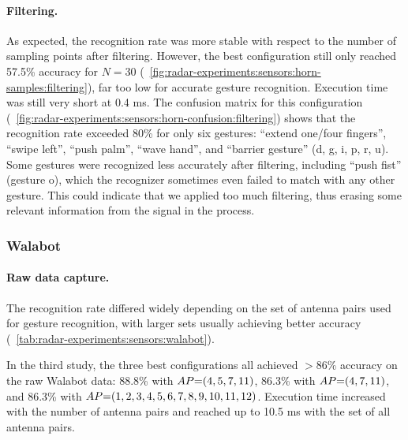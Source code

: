 \paragraph{Filtering.}
As expected, the recognition rate was more stable with respect to the number of sampling points after filtering. However, the best configuration still only reached 57.5\% accuracy for $N{=}30$ (\fig~\ref{fig:radar-experiments:sensors:horn-samples:filtering}), far too low for accurate gesture recognition. 
Execution time was still very short at 0.4 ms. 
The confusion matrix for this configuration (\fig~\ref{fig:radar-experiments:sensors:horn-confusion:filtering}) shows that the recognition rate exceeded 80\% for only six gestures: ``extend one/four fingers'', ``swipe left'', ``push palm'', ``wave hand'', and ``barrier gesture'' (d, g, i, p, r, u). 
%
Some gestures were recognized less accurately after filtering, including ``push fist'' (gesture o), which the recognizer sometimes even failed to match with any other gesture. This could indicate that we applied too much filtering, thus erasing some relevant information from the signal in the process.






\subsubsection{Walabot} \label{sec:radar-experiments:sensors:results:walabot}


\paragraph{Raw data capture.}
The recognition rate differed widely depending on the set of antenna pairs used for gesture recognition, with larger sets usually achieving better accuracy (\tab~\ref{tab:radar-experiments:sensors:walabot}). 

In the third study, the three best configurations all achieved ${>}86\%$ accuracy on the raw Walabot data: 88.8\% with $\splitatcommas{AP{=}(4, 5, 7, 11)}$, 86.3\% with $\splitatcommas{AP{=}(4, 7, 11)}$, and 86.3\% with $\splitatcommas{AP{=}(1,2,3,4,5,6,7,8,9,10,11,12)}$. Execution time increased with the number of antenna pairs and reached up to 10.5 ms with the set of all antenna pairs. 

